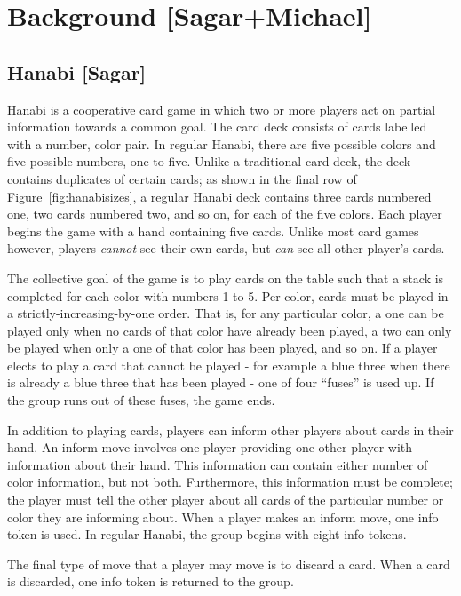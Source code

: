 \section{Background [Sagar+Michael]}
\label{sec:background}

\subsection{Hanabi [Sagar]}

Hanabi \cite{hanabiboardgame, hanabiwiki} is a cooperative card game in which
two or more players act on partial information towards a common goal. The
card deck consists of cards labelled with a number, color pair. In regular
Hanabi, there are five possible colors and five possible numbers, one to five.
Unlike a traditional card deck, the deck contains duplicates of certain cards;
as shown in the final row of Figure~\ref{fig:hanabisizes}, a regular Hanabi
deck contains three cards numbered one, two cards numbered two, and so on, for
each of the five colors. Each player begins the game with a hand containing
five cards. Unlike most card games however, players \emph{cannot} see their
own cards, but \emph{can} see all other player's cards.

The collective goal of the game is to play cards on the table such that a stack
is completed for each color with numbers 1 to 5. Per color, cards must be
played in a strictly-increasing-by-one order. That is, for any particular
color, a one can be played only when no cards of that color have already been
played, a two can only be played when only a one of that color has been played,
and so on.  If a player elects to play a card that cannot be played - for
example a blue three when there is already a blue three that has been played
- one of four ``fuses'' is used up. If the group runs out of these fuses, the
game ends.

In addition to playing cards, players can inform other players about cards
in their hand. An inform move involves one player providing one other player
with information about their hand. This information can contain either number
of color information, but not both. Furthermore, this information must be complete;
the player must tell the other player about all cards of the particular number or
color they are informing about. When a player makes an inform move, one info
token is used. In regular Hanabi, the group begins with eight info tokens.

The final type of move that a player may move is to discard a card. When a card
is discarded, one info token is returned to the group.

